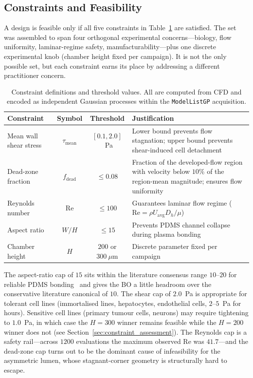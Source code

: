 \documentclass[12pt]{article}
\begin{document}
\subsection{Constraints and Feasibility}
\label{sec:constraints}
A design is feasible only if all five constraints in Table~\ref{tab:constraints} are satisfied. The set was assembled to span four orthogonal experimental concerns---biology, flow uniformity, laminar-regime safety, manufacturability---plus one discrete experimental knob (chamber height fixed per campaign). It is not the only possible set, but each constraint earns its place by addressing a different practitioner concern.

\begin{table}[H]
\centering
\caption{Constraint definitions and threshold values. All are computed from CFD and encoded as independent Gaussian processes within the \texttt{ModelListGP} acquisition.}
\label{tab:constraints}
\begin{tabular}{l c c p{5cm}}
\toprule
\textbf{Constraint} & \textbf{Symbol} & \textbf{Threshold} & \textbf{Justification} \\
\midrule
Mean wall shear stress & $\tau_{\text{mean}}$ & $[0.1, 2.0]$~Pa & Lower bound prevents flow stagnation; upper bound prevents shear-induced cell detachment \\
Dead-zone fraction & $f_{\text{dead}}$ & $\leq 0.08$ & Fraction of the developed-flow region with velocity below $10\%$ of the region-mean magnitude; ensures flow uniformity \\
Reynolds number & $\text{Re}$ & $\leq 100$ & Guarantees laminar flow regime ($\text{Re} = \rho U_{\text{avg}} D_h / \mu$) \\
Aspect ratio & $W/H$ & $\leq 15$ & Prevents PDMS channel collapse during plasma bonding \\
Chamber height & $H$ & $200$ or $300~\mu$m & Discrete parameter fixed per campaign \\
\bottomrule
\end{tabular}
\end{table}

The aspect-ratio cap of $15$ sits within the literature consensus range $10$--$20$ for reliable PDMS bonding~\cite{xia1998} and gives the BO a little headroom over the conservative literature canonical of $10$. The shear cap of $2.0$~Pa is appropriate for tolerant cell lines (immortalised lines, hepatocytes, endothelial cells, $2$--$5$~Pa for hours). Sensitive cell lines (primary tumour cells, neurons) may require tightening to $1.0$~Pa, in which case the $H = 300$ winner remains feasible while the $H = 200$ winner does not (see Section~\ref{sec:constraint_assessment}). The Reynolds cap is a safety rail---across $1200$ evaluations the maximum observed $\text{Re}$ was $41.7$---and the dead-zone cap turns out to be the dominant cause of infeasibility for the asymmetric lumen, whose stagnant-corner geometry is structurally hard to escape.
\end{document}
